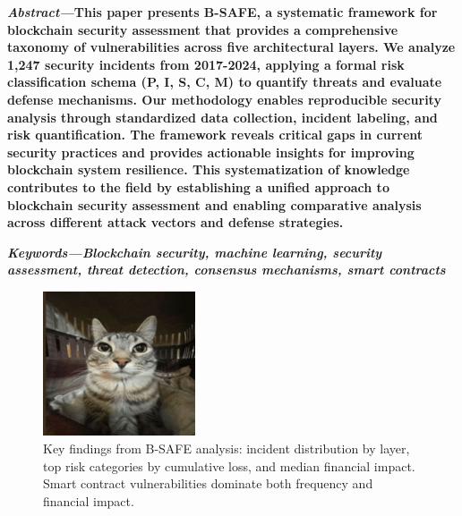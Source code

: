\documentclass[a4paper]{article}
\begin{document}
\begin{multicols}{2}
\setlength{\columnsep}{0.5cm}


\noindent \textbf{\textit{Abstract---}This paper presents B-SAFE, a systematic framework for blockchain security assessment that provides a comprehensive taxonomy of vulnerabilities across five architectural layers. We analyze 1,247 security incidents from 2017-2024, applying a formal risk classification schema (P, I, S, C, M) to quantify threats and evaluate defense mechanisms. Our methodology enables reproducible security analysis through standardized data collection, incident labeling, and risk quantification. The framework reveals critical gaps in current security practices and provides actionable insights for improving blockchain system resilience. This systematization of knowledge contributes to the field by establishing a unified approach to blockchain security assessment and enabling comparative analysis across different attack vectors and defense strategies.
}

\small	
\noindent \textbf{\textit{Keywords---}\textit{Blockchain security, machine learning, security assessment, threat detection, consensus mechanisms, smart contracts}}

\begin{figure}[H]
\centering
\includegraphics[width=0.4\textwidth]{../figure/fig1.png}
\caption{Key findings from B-SAFE analysis: incident distribution by layer, top risk categories by cumulative loss, and median financial impact. Smart contract vulnerabilities dominate both frequency and financial impact.}
\label{fig:key_results}
\end{figure}











\end{multicols}
\end{document}
